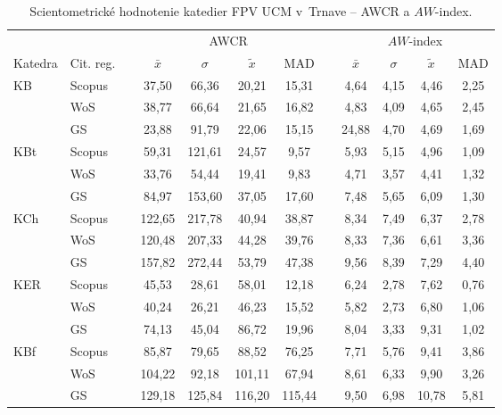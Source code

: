 \begin{table}
  \centering\small
  \caption[Hodnotenie FPV -- AWCR a $AW$-index]%
  {Scientometrické hodnotenie katedier FPV UCM v~Trnave -- AWCR a $AW$-index.}
  \label{tab:5-staff.results}
  \begin{tabularx}{\textwidth}{XXp{0.2ex}ccccp{0.2ex}cccc}
    \toprule
    & & & \multicolumn{4}{c}{AWCR} & & \multicolumn{4}{c}{$AW$-index} \\
    \cmidrule{4-7}\cmidrule{9-12}
    Katedra & Cit. reg. & & $\bar{x}$ & $\sigma$ & $\tilde{x}$ & MAD & & $\bar{x}$ & $\sigma$ & $\tilde{x}$ & MAD \\[0.3ex]
    \midrule
    KB   & Scopus & & 37,50  & 66,36  & 20,21  & 15,31  & & 4,64  & 4,15 & 4,46  & 2,25 \\
         & WoS    & & 38,77  & 66,64  & 21,65  & 16,82  & & 4,83  & 4,09 & 4,65  & 2,45 \\
         & GS     & & 23,88  & 91,79  & 22,06  & 15,15  & & 24,88 & 4,70 & 4,69  & 1,69 \\[1ex]
    KBt  & Scopus & & 59,31  & 121,61 & 24,57  & 9,57   & & 5,93  & 5,15 & 4,96  & 1,09 \\
         & WoS    & & 33,76  & 54,44  & 19,41  & 9,83   & & 4,71  & 3,57 & 4,41  & 1,32 \\
         & GS     & & 84,97  & 153,60 & 37,05  & 17,60  & & 7,48  & 5,65 & 6,09  & 1,30 \\[1ex]
    KCh  & Scopus & & 122,65 & 217,78 & 40,94  & 38,87  & & 8,34  & 7,49 & 6,37  & 2,78 \\
         & WoS    & & 120,48 & 207,33 & 44,28  & 39,76  & & 8,33  & 7,36 & 6,61  & 3,36 \\
         & GS     & & 157,82 & 272,44 & 53,79  & 47,38  & & 9,56  & 8,39 & 7,29  & 4,40 \\[1ex]
    KER  & Scopus & & 45,53  & 28,61  & 58,01  & 12,18  & & 6,24  & 2,78 & 7,62  & 0,76 \\
         & WoS    & & 40,24  & 26,21  & 46,23  & 15,52  & & 5,82  & 2,73 & 6,80  & 1,06 \\
         & GS     & & 74,13  & 45,04  & 86,72  & 19,96  & & 8,04  & 3,33 & 9,31  & 1,02 \\[1ex]
    KBf  & Scopus & & 85,87  & 79,65  & 88,52  & 76,25  & & 7,71  & 5,76 & 9,41  & 3,86 \\
         & WoS    & & 104,22 & 92,18  & 101,11 & 67,94  & & 8,61  & 6,33 & 9,90  & 3,26 \\
         & GS     & & 129,18 & 125,84 & 116,20 & 115,44 & & 9,50  & 6,98 & 10,78 & 5,81 \\[1ex]

\end{tabularx}
\end{table}

